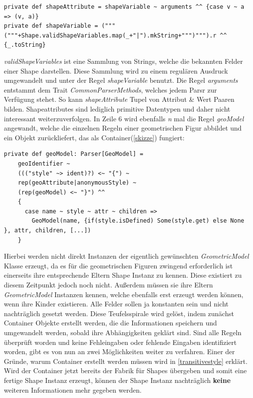 \begin{lstlisting}[style=scala]
private def shapeAttribute = shapeVariable ~ arguments ^^ {case v ~ a => (v, a)}
private def shapeVariable = ("""("""+Shape.validShapeVariables.map(_+"|").mkString+""")""").r ^^ {_.toString}
\end{lstlisting}\textit{validShapeVariables} ist eine Sammlung von Strings, welche die bekannten Felder einer Shape darstellen. Diese Sammlung wird zu einem regulären Ausdruck umgewandelt und unter der Regel \textit{shapeVariable} benutzt. Die Regel \textit{arguments} entstammt dem Trait \textit{CommonParserMethods}, welches jedem Parsr zur Verfügung stehet. So kann \textit{shapeAttribute} Tupel von Attribut \& Wert Paaren bilden. 
Shapeattributes sind lediglich primitive Datentypen und daher nicht interessant weiterzuverfolgen. In Zeile 6 wird ebenfalls \textit{n} mal die Regel \textit{geoModel} angewandt, welche die einzelnen Regeln einer geometrischen Figur abbildet und ein Objekt zurückliefert, das als Container(\ref{skizze}) fungiert:
\begin{lstlisting}[style=scala]
private def geoModel: Parser[GeoModel] =
    geoIdentifier ~
    ((("style" ~> ident)?) <~ "{") ~
    rep(geoAttribute|anonymousStyle) ~
    (rep(geoModel) <~ "}") ^^
    {
      case name ~ style ~ attr ~ children =>
        GeoModel(name, {if(style.isDefined) Some(style.get) else None }, attr, children, [...])
    }
\end{lstlisting}Hierbei werden nicht direkt Instanzen der eigentlich gewünschten \textit{GeometricModel} Klasse erzeugt, da es für die geometrischen Figuren zwingend erforderlich ist einerseits ihre entsprechende Eltern Shape Instanz zu kennen. Diese existiert zu diesem Zeitpunkt jedoch noch nicht. Außerdem müssen sie ihre Eltern \textit{GeometricModel} Instanzen kennen, welche ebenfalls erst erzeugt werden können, wenn ihre Kinder existieren. Alle Felder sollen ja konstanten sein und nicht nachträglich gesetzt werden. Diese Teufelsspirale wird gelöst, indem zunächst Container Objekte erstellt werden, die die Informationen speichern und umgewandelt werden, sobald ihre Abhängigkeiten geklärt sind. Sind alle Regeln überprüft worden und keine Fehleingaben oder fehlende Eingaben identifiziert worden, gibt es von nun an zwei Möglichkeiten weiter zu verfahren. Einer der Gründe, warum Container erstellt werden müssen wird in \ref{transitivestyle} erklärt. Wird der Container jetzt bereits der Fabrik für Shapes übergeben und somit eine fertige Shape Instanz erzeugt, können der Shape Instanz nachträglich \textbf{keine} weiteren Informationen mehr gegeben werden.
